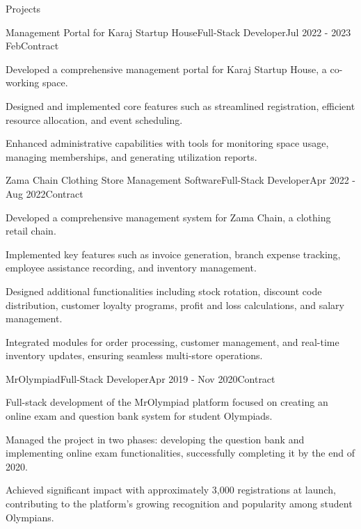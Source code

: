 \documentclass[]{kyvernitis-resume}
\begin{document}
\begin{section}{Projects}


\begin{subsection}{Management Portal for Karaj Startup House}{Full-Stack Developer}{Jul 2022 - 2023 Feb}{Contract}{}
		\item Developed a comprehensive management portal for Karaj Startup House, a co-working space.
		\item Designed and implemented core features such as streamlined registration, efficient resource allocation, and event scheduling.
		\item Enhanced administrative capabilities with tools for monitoring space usage, managing memberships, and generating utilization reports.
\end{subsection}


    \begin{subsection}{Zama Chain Clothing Store Management Software}{Full-Stack Developer}{Apr 2022 - Aug 2022}{Contract}{}
		\item Developed a comprehensive management system for Zama Chain, a clothing retail chain. %
		\item Implemented key features such as invoice generation, branch expense tracking, employee assistance recording, and inventory management.
		\item Designed additional functionalities including stock rotation, discount code distribution, customer loyalty programs, profit and loss calculations, and salary management.
		\item Integrated modules for order processing, customer management, and real-time inventory updates, ensuring seamless multi-store operations.

    \end{subsection}


    \begin{subsection}{MrOlympiad}{Full-Stack Developer}{Apr 2019 - Nov 2020}{Contract}{}
		\item Full-stack development of the MrOlympiad platform  
 focused on creating an online exam and question bank system for student Olympiads.
		\item Managed the project in two phases: developing the question bank and implementing online exam functionalities, successfully completing it by the end of 2020.
		\item Achieved significant impact with approximately 3,000 registrations at launch, contributing to the platform’s growing recognition and popularity among student Olympians.

    \end{subsection}
    
\end{section}
\end{document}

